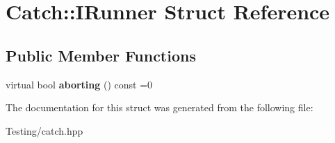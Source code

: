 \hypertarget{struct_catch_1_1_i_runner}{\section{Catch\-:\-:I\-Runner Struct Reference}
\label{struct_catch_1_1_i_runner}
}
\subsection*{Public Member Functions}
\begin{DoxyCompactItemize}
\item 
\hypertarget{struct_catch_1_1_i_runner_a03713202dd2e041e30b8030088ab0116}{virtual bool {\bfseries aborting} () const =0}\label{struct_catch_1_1_i_runner_a03713202dd2e041e30b8030088ab0116}

\end{DoxyCompactItemize}


The documentation for this struct was generated from the following file\-:\begin{DoxyCompactItemize}
\item 
Testing/catch.\-hpp\end{DoxyCompactItemize}
